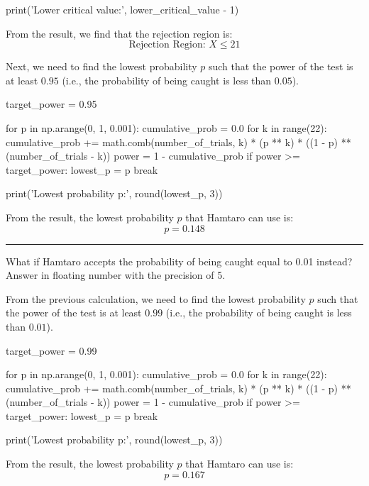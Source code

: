 \documentclass[a4paper, 10pt]{article}
\begin{document}
\begin{tosubmit}
\begin{codingbox}
print('Lower critical value:', lower_critical_value - 1)
\end{codingbox}

From the result, we find that the rejection region is:
\[ \text{Rejection Region: } X \leq 21 \]

\newpage

Next, we need to find the lowest probability \( p \) such that the power of the test is at least \( 0.95 \) (i.e., the probability of being caught is less than \( 0.05 \)).
\begin{codingbox}
target_power = 0.95

for p in np.arange(0, 1, 0.001):
    cumulative_prob = 0.0
    for k in range(22):
        cumulative_prob += math.comb(number_of_trials, k) * (p ** k) * ((1 - p) ** (number_of_trials - k))
    power = 1 - cumulative_prob
    if power >= target_power:
        lowest_p = p
        break

print('Lowest probability p:', round(lowest_p, 3))
\end{codingbox}

From the result, the lowest probability \( p \) that Hamtaro can use is:
\[ \boxed{ p = 0.148 } \]

\vspace{3mm} \hrule \vspace{3mm}

\begin{subproblems}[resume]
    \item What if Hamtaro accepts the probability of being caught equal to 0.01 instead?
    Answer in floating number with the precision of 5.
\end{subproblems}

\par\noindent\submitsolution
From the previous calculation, we need to find the lowest probability \( p \) such that the power of the test is at least \( 0.99 \) (i.e., the probability of being caught is less than \( 0.01 \)).
\begin{codingbox}
target_power = 0.99

for p in np.arange(0, 1, 0.001):
    cumulative_prob = 0.0
    for k in range(22):
        cumulative_prob += math.comb(number_of_trials, k) * (p ** k) * ((1 - p) ** (number_of_trials - k))
    power = 1 - cumulative_prob
    if power >= target_power:
        lowest_p = p
        break

print('Lowest probability p:', round(lowest_p, 3))
\end{codingbox}

From the result, the lowest probability \( p \) that Hamtaro can use is:
\[ \boxed{ p = 0.167 } \]
\end{tosubmit}
\end{document}
